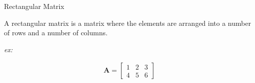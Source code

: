 Rectangular Matrix

\begin{solution}
A rectangular matrix is a matrix where the elements are arranged into a number of rows and a number of columns.

\emph{ex:}

\begin{align*}
    \boldsymbol{A} = \begin{bmatrix}
    1 & 2 & 3 \\ 4 & 5 & 6
    \end{bmatrix}
\end{align*}
\end{solution}